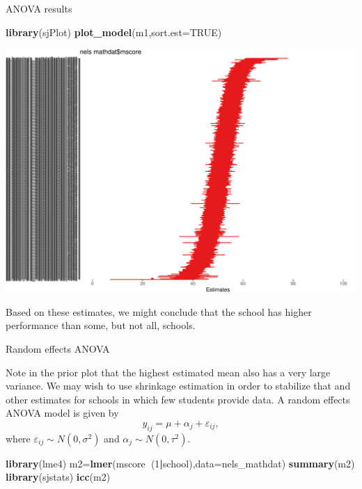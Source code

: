 \documentclass[ignorenonframetext,]{beamer}
\newenvironment{Shaded}{\begin{snugshade}}{\end{snugshade}}
\newcommand{\KeywordTok}[1]{\textcolor[rgb]{0.13,0.29,0.53}{\textbf{#1}}}
\newcommand{\DataTypeTok}[1]{\textcolor[rgb]{0.13,0.29,0.53}{#1}}
\newcommand{\DecValTok}[1]{\textcolor[rgb]{0.00,0.00,0.81}{#1}}
\newcommand{\OtherTok}[1]{\textcolor[rgb]{0.56,0.35,0.01}{#1}}
\newcommand{\OperatorTok}[1]{\textcolor[rgb]{0.81,0.36,0.00}{\textbf{#1}}}
\newcommand{\NormalTok}[1]{#1}
\begin{document}
\begin{frame}[fragile]{ANOVA results}

\begin{Shaded}
\begin{Highlighting}[]
\KeywordTok{library}\NormalTok{(sjPlot)}
\KeywordTok{plot_model}\NormalTok{(m1,}\DataTypeTok{sort.est=}\OtherTok{TRUE}\NormalTok{)}
\end{Highlighting}
\end{Shaded}

\end{frame}

\begin{frame}{}

\includegraphics{anova_06_deck_files/figure-beamer/catplot1-1.pdf}

Based on these estimates, we might conclude that the school has higher
performance than some, but not all, schools.

\end{frame}

\begin{frame}[fragile]{Random effects ANOVA}

Note in the prior plot that the highest estimated mean also has a very
large variance. We may wish to use shrinkage estimation in order to
stabilize that and other estimates for schools in which few students
provide data. A random effects ANOVA model is given by
\[y_{ij}=\mu+\alpha_j+\varepsilon_{ij},\] where
\(\varepsilon_{ij} \sim N(0,\sigma^2)\) and
\(\alpha_j \sim N(0,\tau^2)\).

\begin{Shaded}
\begin{Highlighting}[]
\KeywordTok{library}\NormalTok{(lme4)}
\NormalTok{m2=}\KeywordTok{lmer}\NormalTok{(mscore}\OperatorTok{~}\NormalTok{(}\DecValTok{1}\OperatorTok{|}\NormalTok{school),}\DataTypeTok{data=}\NormalTok{nels_mathdat)}
\KeywordTok{summary}\NormalTok{(m2)}
\KeywordTok{library}\NormalTok{(sjstats)}
\KeywordTok{icc}\NormalTok{(m2)}
\end{Highlighting}
\end{Shaded}

\end{frame}
\end{document}
